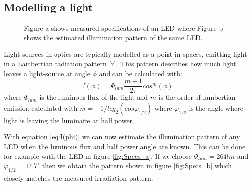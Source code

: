 \subsection{Modelling a light}

\begin{figure}
	\centering     %
	\caption{Figure a shows measured specifications of an LED \cite{lamptest} where Figure b shows the estimated illumination pattern of the same LED.}
\end{figure}

\label{subsec:Modeling_of_light}
Light sources in optics are typically modelled as a point in spaces, emitting light in a Lambertian radiation pattern [x]. This pattern describes how much light leaves a light-source at angle $\phi$ and can be calculated with:
\begin{equation}
\label{eq:I(phi)}
I(\phi)=\Phi_{lum}\frac{m+1}{2\pi}cos^m(\phi)
\end{equation}
where $\Phi_{lum}$ is the luminous flux of the light and $m$ is the order of lambertian emission calculated with $m = -1 / log_2(cos\varphi_{1/2})$ where $\varphi_{1/2}$ is the angle where light is leaving the luminaire at half power. 

With equation \ref{eq:I(phi)} we can now estimate the illumination pattern of any LED when the luminous flux and half power angle are known. This can be done  for example with the LED in figure \ref{fig:Specs_a}. If we choose $\Phi_{lum} = 264 lm$ and $\varphi_{1/2} = 17.7^{\circ}$ then we obtain the pattern shown in figure \ref{fig:Specs_b} which closely matches the measured irradiation pattern.

